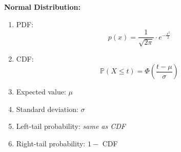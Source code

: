 \documentclass[titlepage, 12pt, leqno]{article}
\begin{document}
\setlength{\parskip}{0.5\baselineskip}
\setlength{\parindent}{15pt}
\setlength{\belowdisplayskip}{0pt}
\setlength{\abovedisplayskip}{0pt}
\setlength{\belowdisplayshortskip}{0pt}
\setlength{\abovedisplayshortskip}{0pt}



\begin{multicols*}{2}

\textbf{Normal Distribution:}
\begin{enumerate}
    \item PDF: 
        \[
            p(x) = \frac{1}{\sqrt{2\pi }}\cdot e^{-\frac{x^2}{2}}
        \]
    \item CDF:
        \[
            \mathbb{P}(X \le t) = \Phi\left(\frac{t-\mu}{\sigma}\right)
        \]
    \item Expected value: $\mu$ 
    \item Standard deviation: $\sigma$
    \item Left-tail probability: \textit{same as CDF}
    \item Right-tail probability: $1 - $ CDF


\end{enumerate}
\end{multicols*}
\end{document}
